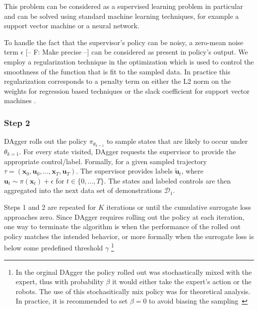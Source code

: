 \documentclass[10pt, conference]{ieeeconf}      %
\newcommand{\bu}{\mathbf{u}}
\newcommand{\bx}{\mathbf{x}}
\begin{document}
This problem can be considered as a supervised learning problem in particular and can be solved using standard machine
learning techniques, for example a support vector machine or a neural network. 
 
To handle the fact that the supervisor's policy can be noisy, a zero-mean noise term $\epsilon$ 
{ \color{blue} [-- F: Make precise --]}
can be considered as present in policy's output. We employ a regularization technique in the optimization which is
used to control the smoothness of the function that is fit to the sampled data. In practice this regularization corresponds to a penalty term on either the L2 norm on the weights for regression based techniques or the slack coefficient for support vector machines \cite{scholkopf2002learning}.
 
 \subsubsection{Step 2}
DAgger rolls out the policy $\pi_{\theta_{k=1}}$ to sample states that are likely to occur under $\theta_{k=1}$. For every state visited, DAgger requests the supervisor to provide the appropriate control/label. Formally, for a given sampled trajectory  $\tau = (\bx_0,\bu_0,...,\bx_T,\bu_T )$. The supervisor provides labels $\tilde{\bu}_t$, where $\bu_t \sim \pi(\bx_t) + \epsilon$ for $t\in \{0, \ldots, T\}$.
The states and labeled controls are then aggregated into the next data set of demonstrations $\mathcal{D}_1$. 

Steps 1 and 2 are repeated for $K$ iterations or until the cumulative surrogate loss approaches zero. Since DAgger
requires rolling out the policy at each iteration, one way to terminate the algorithm is when the performance of the
rolled out policy matches the intended behavior, or more formally when the surrogate loss is below some predefined
threshold $\gamma$ \footnote{In the orginal DAgger the policy rolled out was stochastically mixed with the expert, thus with probability $\beta$ it would either take the expert's action or the robots. The use of this stochasitically mix policy was for theoretical analysis. In practice, it is recommended to set $\beta = 0$ to avoid biasing the sampling~\cite{NIPS2014_5421,ross2010reduction}}
\end{document}
